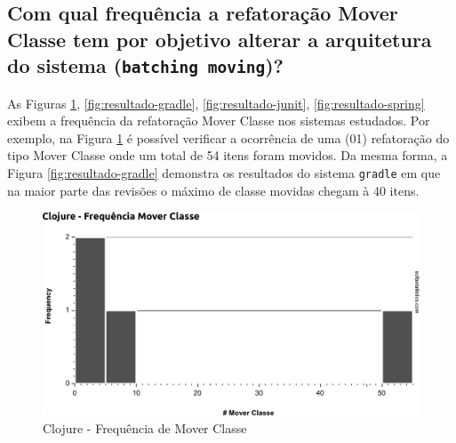 \documentclass[12pt]{article}
\begin{document}
\begin{table}[htb]
	\centering
	\caption{Estatísticas dos Sistemas Analisados}
	\label{tab:estatisticas}
\end{table}

\subsection{Com qual frequência a refatoração Mover Classe tem por objetivo alterar a arquitetura do sistema (\texttt{batching moving})?}

As Figuras \ref{fig:resultado-clojure}, \ref{fig:resultado-gradle}, \ref{fig:resultado-junit}, \ref{fig:resultado-spring} exibem a frequência da refatoração Mover Classe nos sistemas estudados. Por exemplo, na Figura \ref{fig:resultado-clojure} é possível verificar a ocorrência de uma (01) refatoração do tipo Mover Classe onde um total de 54 itens foram movidos. Da mesma forma, a Figura \ref{fig:resultado-gradle} demonstra os resultados do sistema \texttt{gradle} em que na maior parte das revisões o máximo de classe movidas chegam à 40 itens.


\begin{figure}[htb]
\centering
\includegraphics[width=0.9\linewidth]{../img/0006_Histogram_Clojure_Frequencia_Mover_Classe}
	\caption{Clojure - Frequência de Mover Classe}
\label{fig:resultado-clojure}
\end{figure}
\end{document}
